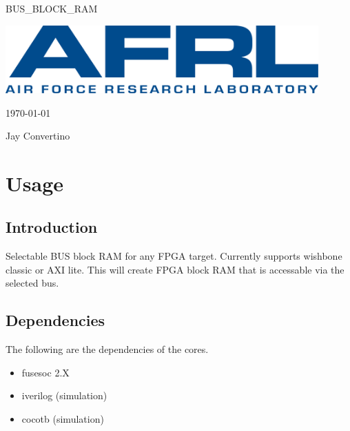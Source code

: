 \begin{titlepage}
  \begin{center}

  {\Huge BUS\_BLOCK\_RAM}

  \vspace{25mm}

  \includegraphics[width=0.90\textwidth,height=\textheight,keepaspectratio]{img/AFRL.png}

  \vspace{25mm}

  \today

  \vspace{15mm}

  {\Large Jay Convertino}

  \end{center}
\end{titlepage}

\tableofcontents

\newpage

\section{Usage}

\subsection{Introduction}

\par
Selectable BUS block RAM for any FPGA target. Currently supports wishbone classic or AXI lite. This will create FPGA block RAM that is accessable
via the selected bus.

\subsection{Dependencies}

\par
The following are the dependencies of the cores.

\begin{itemize}
  \item fusesoc 2.X
  \item iverilog (simulation)
  \item cocotb (simulation)
\end{itemize}

